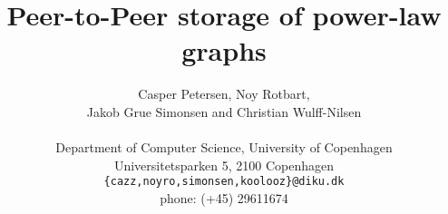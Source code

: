 \documentclass{acm_proc_article-sp}
\begin{document}
\title{Peer-to-Peer storage of power-law graphs}
%
%
%
%
%

%

\author{Casper Petersen, Noy Rotbart,\\ Jakob Grue Simonsen and Christian Wulff-Nilsen \\ \\
\small{Department of Computer Science, University of Copenhagen} \\
\small{Universitetsparken 5, 2100 Copenhagen}\\
 \small{\texttt{\{cazz,noyro,simonsen,koolooz\}@diku.dk}} \\
 \small{phone: (+45) 29611674}
 }
 
\end{document}
